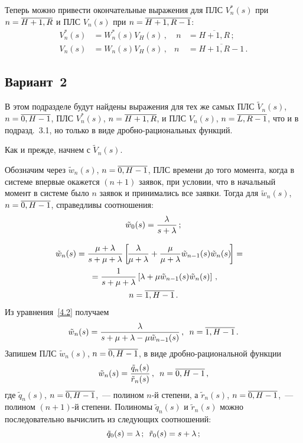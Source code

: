 \begin{multicols}{2}
Теперь можно привести окончательные выражения
для ПЛС $V^*_n(s)$ при $n\hm=\overline{H+1,R}$
и ПЛС $V_n(s)$ при $n\hm=\overline{H+1,R-1}$:
\begin{alignat*}{2}
V^*_n(s) &= W^*_n(s) V_H(s)\,,&\ n&=\overline{H+1,R}\,;
\\
V_n(s) &= W_n(s) V_H(s)\,, & n&=\overline{H+1,R-1}\,.
\end{alignat*}

\subsection{Вариант~2}

В этом подразделе будут найдены выражения для тех же самых ПЛС $\tilde{V}_n(s)$, 
$n\hm=\overline{0,H-1}$, ПЛС $V^*_n(s)$,
$n\hm=\overline{H+1,R}$, и ПЛС $V_n(s)$, $n\hm=\overline{L,R-1}$, что и
в подразд.~3.1, но только в виде дроб\-но-ра\-ци\-о\-наль\-ных функций.

Как и прежде, начнем с $\tilde{V}_n(s)$.

Обозначим  через $\tilde{w}_n(s)$, $n\hm=\overline{0,H-1}$, ПЛС времени
до того момента, когда в системе впервые окажется $(n+1)$ заявок,
при условии, что в начальный момент в системе было $n$ заявок и
принимались все заявки.
Тогда для $\tilde{w}_n(s)$, $n\hm=\overline{0,H-1}$, справедливы соотношения:
\begin{equation*}
\tilde{w}_0(s) = \displaystyle\frac{\displaystyle \lambda\mathstrut}{\displaystyle s+\lambda\mathstrut}\,;
\end{equation*}

\vspace*{-12pt}

\noindent
\begin{multline}
\label{4.2}
\hspace*{-8pt}\tilde{w}_n(s) = \displaystyle\frac{\displaystyle \mu+\lambda\mathstrut}{\displaystyle s+\mu+\lambda\mathstrut} 
\left[ \!\displaystyle\frac{\displaystyle \lambda\mathstrut}{\displaystyle \mu+\lambda\mathstrut} +
\displaystyle\frac{\displaystyle \mu\mathstrut}{\displaystyle \mu+\lambda\mathstrut} \tilde{w}_{n-1}(s) \tilde{w}_n(s)
\!\right] ={} \hspace*{-0.391pt}
\\
{}= \displaystyle\frac{\displaystyle 1\mathstrut}{\displaystyle s+\mu+\lambda\mathstrut} \left[
\lambda + \mu \tilde{w}_{n-1}(s) \tilde{w}_n(s)
\right]\,,\\ n=\overline{1,H-1}\,.
\end{multline}
Из уравнения~\eqref{4.2} получаем
\begin{equation*}
\tilde{w}_n(s) = \displaystyle\frac{\displaystyle  \lambda\mathstrut}{\displaystyle s+\mu+\lambda-\mu \tilde{w}_{n-1}(s) \mathstrut}\,,\enskip
n=\overline{1,H-1}\,.
\end{equation*}
Запишем ПЛС $\tilde{w}_n(s)$, $n\hm=\overline{0,H-1}$,
в виде дроб\-но-ра\-ци\-о\-наль\-ной функции
\begin{equation}
\label{4.4}
\tilde{w}_n(s) =
\displaystyle\frac{\displaystyle \tilde{q}_{n}(s) \mathstrut}{\displaystyle \tilde{r}_{n}(s)\mathstrut}\,, \enskip n=\overline{0,H-1}\,,
\end{equation}
где $\tilde{q}_{n}(s)$, $n\hm=\overline{0,H-1}$,~--- полином $n$-й
степени, а $\tilde{r}_{n}(s)$, $n\hm=\overline{0,H-1}$,~--- полином
$(n+1)$-й степени.
Полиномы $\tilde{q}_{n}(s)$ и $\tilde{r}_{n}(s)$ можно последовательно
вычислить из следующих соотношений:
$$
\tilde{q}_0(s) = \lambda \,; \enskip 
\tilde{r}_0(s) = s + \lambda\,;\notag
$$


\end{multicols}
